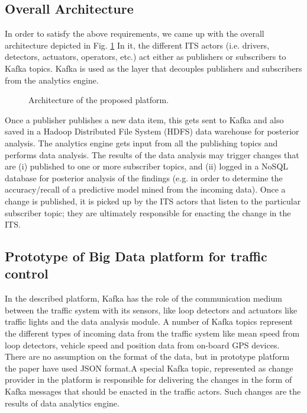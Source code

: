 \documentclass[sigconf]{acmart}
\begin{document}
\subsection{Overall Architecture}
In order to satisfy the above requirements, we came up with the overall architecture depicted in Fig. \ref{fig:1} In it, the different ITS actors (i.e. drivers, detectors, actuators, operators, etc.) act either as publishers or subscribers to Kafka topics. Kafka is used as the layer that decouples publishers and subscribers from the analytics engine. 

\begin{figure}[h]
\centering
{}
\caption{Architecture of the proposed platform.}
\label{fig:1}
\end{figure}


Once a publisher publishes a new data item, this gets sent to Kafka and also saved in a Hadoop Distributed File System (HDFS) data warehouse for posterior analysis. The analytics engine gets input from all the publishing topics and performs data analysis. The results of the data analysis may trigger changes that are (i) published to one or more subscriber topics, and (ii) logged in a NoSQL database for posterior analysis of the findings (e.g. in order to determine the accuracy/recall of a predictive model mined from the incoming data). Once a change is published, it is picked up by the ITS actors that listen to the particular subscriber topic; they are ultimately responsible for enacting the change in the ITS.

\subsection{Prototype of Big Data platform for traffic control}

In the described platform, Kafka has the role of the communication medium between the traffic system with its sensors, like loop detectors and actuators like traffic lights and the data analysis module. A number of Kafka topics represent the different types of incoming data from the traffic system like mean speed from loop detectors, vehicle speed and position data from on-board GPS devices. There are no assumption on the format of the data, but in prototype platform the paper have used JSON format.A special Kafka topic, represented as change provider in the platform is responsible for delivering the changes in the form of Kafka messages that should be enacted in the traffic actors. Such changes are the results of data analytics engine.
\end{document}
